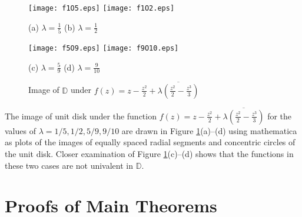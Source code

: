\documentclass[a4paper,12pt]{amsart}
\theoremstyle{definition}
\begin{document}
\begin{figure}
\begin{center}
\texttt{[image: f1O5.eps]}
\hspace{1cm}
\texttt{[image: f1O2.eps]}
\end{center}
{(a) $\lambda=\frac{1}{5}$ \hspace{5cm} (b) $\lambda=\frac{1}{2}$}

\begin{center}
\texttt{[image: f5O9.eps]}
\hspace{1cm}
\texttt{[image: f9O10.eps]}
\end{center}
(c) $\lambda=\frac{5}{9}$ \hspace{5cm} (d) $\lambda=\frac{9}{10}$
\caption{Image of $\mathbb{D}$ under $f(z)=z-\frac{z^2}{2}+\overline{\lambda \left (\frac{z^2}{2} -\frac{z^3}{3} \right )}$\label{fig1}}
\end{figure}
The image of unit disk under the function $f(z)=z-\frac{z^2}{2}+\overline{\lambda \left (\frac{z^2}{2} -\frac{z^3}{3} \right )}$ for
the values of $\lambda=1/5,1/2,5/9,9/10$ are drawn in Figure \ref{fig1}(a)--(d) using mathematica as plots of the images of equally spaced
radial segments and concentric circles of the unit disk. Closer examination of Figure \ref{fig1}(c)--(d) shows that the functions in these two
cases are not univalent in ${{\mathbb D}}$.

\section{Proofs of Main Theorems}\label{sec-2}
\end{document}
